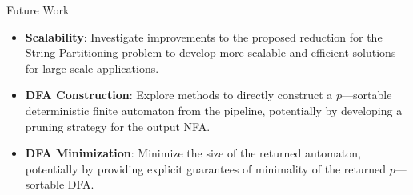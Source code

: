 \documentclass[aspectratio=169]{beamer}
\begin{document}
\begin{frame}{Future Work}
  \begin{itemize}
    \item \textbf{Scalability}: Investigate improvements to the proposed reduction for the String Partitioning problem to develop more scalable and efficient solutions for large-scale applications.
	  \item \textbf{DFA Construction}: Explore methods to directly construct a $p$—sortable deterministic finite automaton from the pipeline, potentially by developing a pruning strategy for the output NFA.
	  \item \textbf{DFA Minimization}: Minimize the size of the returned automaton, potentially by providing explicit guarantees of minimality of the returned $p$—sortable DFA.
  \end{itemize}
\end{frame}
\end{document}
